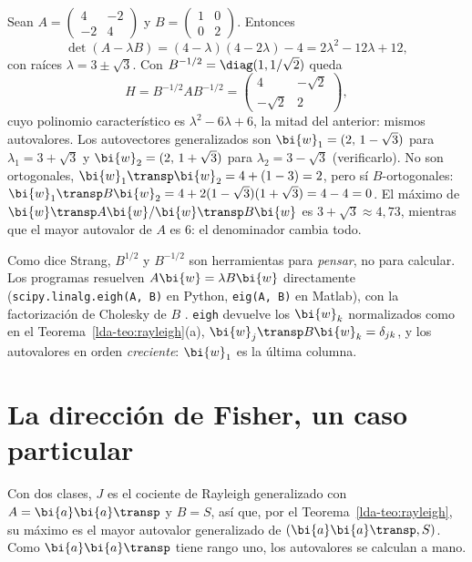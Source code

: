 \begin{example}\label{lda-ejem:strang}
Sean $A=\left(\begin{smallmatrix}4&-2\\-2&4\end{smallmatrix}\right)$ y
$B=\left(\begin{smallmatrix}1&0\\0&2\end{smallmatrix}\right)$. Entonces
\[
\det(A-\lambda B)=(4-\lambda)(4-2\lambda)-4=2\lambda^2-12\lambda+12,
\]
con raíces $\lambda=3\pm\sqrt3$. Con $B^{-1/2}=\diag(1,1/\sqrt2)$ queda
\[
H=B^{-1/2}AB^{-1/2}=\begin{pmatrix}4&-\sqrt2\\-\sqrt2&2\end{pmatrix},
\]
cuyo polinomio característico es $\lambda^2-6\lambda+6$, la mitad del
anterior: mismos autovalores. Los autovectores generalizados son
$\bi{w}_1=(2,\,1-\sqrt3)$ para $\lambda_1=3+\sqrt3$ y $\bi{w}_2=(2,\,1+\sqrt3)$ para
$\lambda_2=3-\sqrt3$ (verificarlo). No son ortogonales,
$\bi{w}_1\transp \bi{w}_2=4+(1-3)=2$, pero sí $B$-ortogonales:
$\bi{w}_1\transp B\bi{w}_2=4+2(1-\sqrt3)(1+\sqrt3)=4-4=0$. El máximo de
$\bi{w}\transp A\bi{w}/\bi{w}\transp B\bi{w}$ es $3+\sqrt3\approx4{,}73$, mientras que el mayor
autovalor de $A$ es $6$: el denominador cambia todo.
\end{example}

\begin{remark}[En la computadora]\label{lda-rem:computadora}
Como dice Strang, $B^{1/2}$ y $B^{-1/2}$ son herramientas para \emph{pensar},
no para calcular. Los programas resuelven $A\bi{w}=\lambda B\bi{w}$ directamente
(\texttt{scipy.linalg.eigh(A, B)} en Python, \texttt{eig(A, B)} en Matlab), con
la factorización de Cholesky de $B$ \cite[Sección~8.7]{GolubVanLoan2013}.
\texttt{eigh} devuelve los $\bi{w}_k$ normalizados como en el
Teorema~\ref{lda-teo:rayleigh}(a), $\bi{w}_j\transp B\bi{w}_k=\delta_{jk}$, y los
autovalores en orden \emph{creciente}: $\bi{w}_1$ es la última columna.
\end{remark}

\section{La dirección de Fisher, un caso particular}\label{lda-sec:direccion}

Con dos clases, $J$ es el cociente de Rayleigh generalizado con $A=\bi{a}\bi{a}\transp$ y
$B=S$, así que, por el Teorema~\ref{lda-teo:rayleigh}, su máximo es el mayor
autovalor generalizado de $(\bi{a}\bi{a}\transp,S)$. Como $\bi{a}\bi{a}\transp$ tiene rango uno,
los autovalores se calculan a mano.

